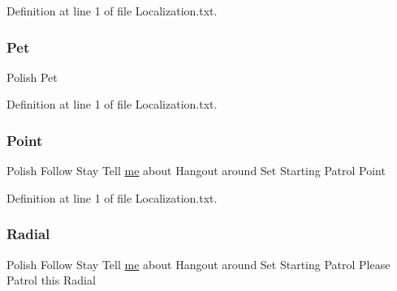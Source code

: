 Definition at line 1 of file Localization.\+txt.

\mbox{\label{_blooms_01_animal_01_husbandry_2_config_2_localization_8txt_a8c30e07ea775697a74d9093d8bc7c695}} 
\subsubsection{\texorpdfstring{Pet}{Pet}}
{\footnotesize\ttfamily Polish Pet}



Definition at line 1 of file Localization.\+txt.

\mbox{\label{_blooms_01_animal_01_husbandry_2_config_2_localization_8txt_ae97f634308ac93fb3604e2f908af006e}} 
\subsubsection{\texorpdfstring{Point}{Point}}
{\footnotesize\ttfamily Polish Follow Stay Tell \mbox{\hyperlink{_blooms_01_animal_01_husbandry_2_config_2_localization_8txt_a290fbecf7c016b09bc675718400d6fca}{me}} about Hangout around Set Starting Patrol Point}



Definition at line 1 of file Localization.\+txt.

\mbox{\label{_blooms_01_animal_01_husbandry_2_config_2_localization_8txt_a572fddd3d55e8bcf216db04fa3e992dd}} 
\subsubsection{\texorpdfstring{Radial}{Radial}}
{\footnotesize\ttfamily Polish Follow Stay Tell \mbox{\hyperlink{_blooms_01_animal_01_husbandry_2_config_2_localization_8txt_a290fbecf7c016b09bc675718400d6fca}{me}} about Hangout around Set Starting Patrol Please Patrol this Radial}



